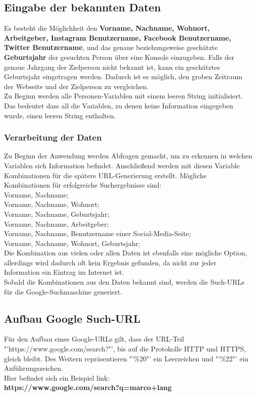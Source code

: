 	\subsection{Eingabe der bekannten Daten}
	Es besteht die Möglichkeit den \textbf{Vorname, Nachname, Wohnort, Arbeitgeber, Instagram Benutzername, Facebook Benutzername, Twitter Benutzername}, und das genaue beziehungsweise geschätzte \textbf{Geburtsjahr} der gesuchten Person über eine Konsole einzugeben. Falls der genaue Jahrgang der Zielperson nicht bekannt ist, kann ein geschätztes Geburtsjahr eingetragen werden. Dadurch ist es möglich, den groben Zeitraum der Webseite und der Zielperson zu vergleichen.\\
	Zu Beginn werden alle Personen-Variablen mit einem leeren String initialisiert. Das bedeutet dass all die Variablen, zu denen keine Information eingegeben wurde, einen leeren String enthalten.
	
		\subsubsection{Verarbeitung der Daten}
		Zu Beginn der Anwendung werden Abfragen gemacht, um zu erkennen in welchen Variablen sich Information befindet. Anschließend werden mit diesen Variable Kombinationen für die spätere URL-Generierung erstellt. Mögliche Kombinationen für erfolgreiche Suchergebnisse sind:\\
		Vorname, Nachname;\\
		Vorname, Nachname, Wohnort;\\
		Vorname, Nachname, Geburtsjahr;\\
		Vorname, Nachname, Arbeitgeber;\\
		Vorname, Nachname, Benutzername einer Social-Media-Seite;\\
		Vorname, Nachname, Wohnort, Geburtsjahr;\\
		Die Kombination aus vielen oder allen Daten ist ebenfalls eine mögliche Option, allerdings wird dadurch oft kein Ergebnis gefunden, da nicht zur jeder Information ein Eintrag im Internet ist.\\
		Sobald die Kombinationen aus den Daten bekannt sind, werden die Such-URLs für die Google-Suchmaschine generiert.
		
	\subsection{Aufbau Google Such-URL}
	\label{subsec:AufbauGoogleURL}
		Für den Aufbau eines Google-URLs gilt, dass der URL-Teil "'https://www.google.com/search?"', bis auf die Protokolle HTTP und HTTPS, gleich bleibt. Des Weitern repräsentieren "'\%20"' ein Leerzeichen und "'\%22"' ein Anführungszeichen. \\
		Hier befindet sich ein Beispiel link:\\
		\textbf{https://www.google.com/search?q=marco+lang}

